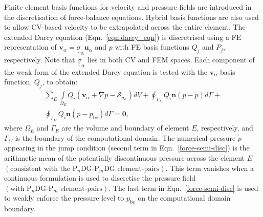 \documentclass[preprint,authoryear,12pt]{elsarticle}
\newcommand{\PN}[2][error]{P$_{#1}$DG-P$_{#2}$}
\newcommand{\PNDG}[2][error]{P$_{#1}$DG-P$_{#2}$DG}
\begin{document}
\medskip 
Finite element basis functions for velocity and pressure fields are introduced in the discretisation of force-balance equations. Hybrid basis functions are also used to allow CV-based velocity to be extrapolated across the entire element. The extended Darcy equation (Eqn.~\ref{eqn:darcy_eqn}) is discretrised using a FE representation of $\mathbf{v}_{\alpha}=\underline{\underline{\sigma}}_{\alpha}\mathbf{u}_{\alpha}$ and $p$ with FE basis functions $Q_{j}$ and $P_{j}$, respectively. Note that $\underline{\underline{\sigma}}_{\alpha}$ lies in both CV and FEM spaces. Each component of the weak form of the extended Darcy equation is tested with the $\mathbf{v}_\alpha$ basis function, $Q_{j}$, to obtain:
\begin{eqnarray}
  \sum\limits_{E} \left. \int\limits_{\Omega_E} { {Q}}_{i} \left({\mathbf v}_\alpha + \nabla p  - \mathcal{S}_{u_\alpha} \right) dV \right. + \displaystyle \oint_{\Gamma_{E}} {Q}_i {\mathbf n} \left(p - \tilde{p}\right) d\Gamma + \nonumber \\ 
  \oint_{\Gamma_{\Omega}} {Q}_i {\mathbf n} \left(p - p_\text{bc}\right) d\Gamma = \bm{0},
                   \label{force-semi-disc} 
\end{eqnarray} 
where $\Omega_E$ and $\Gamma_{E}$ are the volume and boundary of element $E$, respectively, and $\Gamma_{\Omega}$ is the boundary of the computational domain. The numerical pressure $\tilde{p}$ appearing in the jump condition (second term in Eqn.~\ref{force-semi-disc}) is the arithmetic mean of the potentially discontinuous pressure across the element $E$ $\left(\text{consistent with the \PNDG[n]{m} element-pairs}\right)$. This term vanishes when a continuous formulation is used to discretise the pressure field $\left(\text{with \PN[n]{m} element-pairs}\right)$. The last term in Eqn.~\ref{force-semi-disc} is used to weakly enforce the pressure level to $p_\text{bc}$ on the computational domain boundary.
\end{document}
